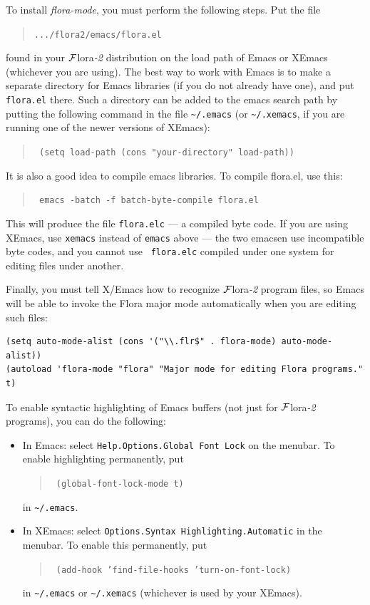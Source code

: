 \documentclass[11pt]{article}
\newcommand{\FLORA}{{\mbox{\sc ${\cal F}${lora}\rm\emph{-2}}}\xspace}
\begin{document}
To install \emph{flora-mode}, you must perform the following steps. Put the
file
\begin{quote}
  {\tt .../flora2/emacs/flora.el} 
\end{quote}
found in your \FLORA distribution on the load path of Emacs or XEmacs
(whichever you are using). The best way to work with Emacs is to make a
separate directory for Emacs libraries (if you do not already have one), and put
{\tt flora.el} there. Such a directory can be added to the emacs search path by
putting the following command in the file \verb|~/.emacs| (or
\verb|~/.xemacs|, if you are running one of the newer versions of XEmacs):
\begin{quote}
  \tt
   (setq load-path (cons "your-directory" load-path)) 
\end{quote}
It is also a good idea to compile emacs libraries. To compile flora.el,
use this:
\begin{quote}
  \tt
   emacs -batch -f batch-byte-compile flora.el 
\end{quote}
This will produce the file {\tt flora.elc} --- a compiled byte code.
If you are using XEmacs, use {\tt xemacs} instead of {\tt emacs} above ---
the two emacsen use incompatible byte codes, and you cannot use {\tt
  flora.elc} compiled under one system for editing files under another.

Finally, you must tell X/Emacs how to recognize \FLORA program files, so
Emacs will be able to invoke the Flora major mode automatically when you
are editing such files:
\begin{verbatim}
(setq auto-mode-alist (cons '("\\.flr$" . flora-mode) auto-mode-alist))
(autoload 'flora-mode "flora" "Major mode for editing Flora programs." t)
\end{verbatim}

To enable syntactic highlighting of Emacs buffers (not just for \FLORA
programs), you can do the following:
\begin{itemize}
  \item  {\sf In Emacs:} select {\tt Help.Options.Global Font Lock} on
    the menubar.  To enable highlighting permanently, put 
    \begin{quote}
      \tt
      (global-font-lock-mode t)
    \end{quote}
    in \verb|~/.emacs|.
  \item {\sf In XEmacs:} select {\tt Options.Syntax
        Highlighting.Automatic} in the menubar. To enable this permanently, put
      \begin{quote}
        \tt
        (add-hook 'find-file-hooks 'turn-on-font-lock)
      \end{quote}
      in \verb|~/.emacs| or \verb|~/.xemacs| (whichever is used by your
      XEmacs).
\end{itemize}
\end{document}
